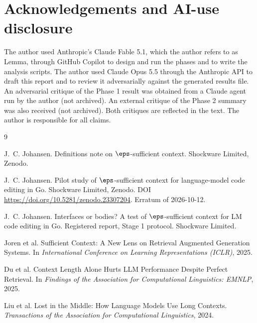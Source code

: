 \section*{Acknowledgements and AI-use disclosure}

The author used Anthropic's Claude Fable 5.1, which the author refers to as Lemma, through GitHub Copilot to design and run the phases and to write the analysis scripts. The author used Claude Opus 5.5 through the Anthropic API to draft this report and to review it adversarially against the generated results file. An adversarial critique of the Phase 1 result was obtained from a Claude agent run by the author (not archived). An external critique of the Phase 2 summary was also received (not archived). Both critiques are reflected in the text. The author is responsible for all claims.

\begin{thebibliography}{9}

J.~C. Johansen.
Definitions note on $\eps$-sufficient context.
Shockware Limited, Zenodo.

J.~C. Johansen.
Pilot study of $\eps$-sufficient context for language-model code editing in Go.
Shockware Limited, Zenodo.
DOI \url{https://doi.org/10.5281/zenodo.23307204}.
Erratum of 2026-10-12.

J.~C. Johansen.
Interfaces or bodies? A test of $\eps$-sufficient context for LM code editing in Go.
Registered report, Stage 1 protocol. Shockware Limited.

Joren et al.
Sufficient Context: A New Lens on Retrieval Augmented Generation Systems.
In \emph{International Conference on Learning Representations (ICLR)}, 2025.

Du et al.
Context Length Alone Hurts LLM Performance Despite Perfect Retrieval.
In \emph{Findings of the Association for Computational Linguistics: EMNLP}, 2025.

Liu et al.
Lost in the Middle: How Language Models Use Long Contexts.
\emph{Transactions of the Association for Computational Linguistics}, 2024.

\end{thebibliography}
